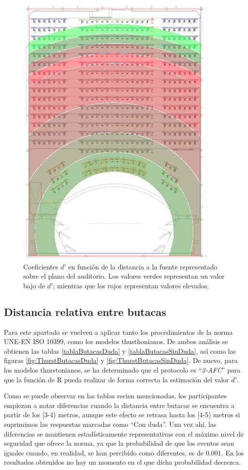 \documentclass[11pt,a4paper]{book}
\begin{document}
            \begin{figure}[H]
                \includegraphics[scale=0.9]{../imagenes/auditoriodprime.png}
			    \centering
			    \caption{Coeficientes $d'$ en función de la distancia a la fuente representado sobre el plano del auditorio. Los valores verdes representan un valor bajo de $d'$; mientras que los rojos representan valores elevados.} 
			    \label{fig:dprimeauditorio}
            \end{figure}
        
        \subsection{Distancia relativa entre butacas}
            Para este apartado se vuelven a aplicar tanto los procedimientos de la norma UNE-EN ISO 10399, como los modelos thusthonianos. De ambos análisis se obtienen las tablas \ref{tablaButacasDuda} y \ref{tablaButacasSinDuda}, así como las figuras \ref{fig:ThurstButacasDuda} y \ref{fig:ThurstButacasSinDuda}. De nuevo, para los modelos thurstonianos, se ha determinado que el protocolo es ``\textit{2-AFC}'' para que la función de R pueda realizar de forma correcta la estimación del valor $d'$.
            
            Como se puede observar en las tablas recien mencionadas, los participantes empiezan a notar diferencias cuando la distancia entre butacas se encuentra a partir de los [3-4) metros, aunque este efecto se retrasa hasta los [4-5) metros si suprimimos las respuestas marcadas como ``Con duda''. Una vez ahí, las diferencias se mantienen estadísticamente representativas con el máximo nivel de seguridad que ofrece la norma, ya que la probabilidad de que los eventos sean iguales cuando, en realidad, se han percibido como diferentes, es de 0.001. En los resultados obtenidos no hay un momento en el que dicha probabilidad decrezca.
            
\end{document}
